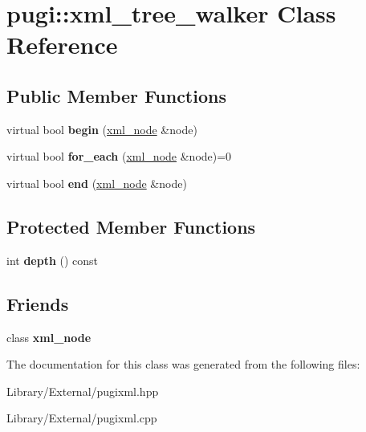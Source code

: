 \hypertarget{classpugi_1_1xml__tree__walker}{}\section{pugi\+:\+:xml\+\_\+tree\+\_\+walker Class Reference}
\label{classpugi_1_1xml__tree__walker}
\subsection*{Public Member Functions}
\begin{DoxyCompactItemize}
\item 
\hypertarget{classpugi_1_1xml__tree__walker_a831cc2fc61a47e23673c85efc41bc7a2}{}virtual bool {\bfseries begin} (\hyperlink{classpugi_1_1xml__node}{xml\+\_\+node} \&node)\label{classpugi_1_1xml__tree__walker_a831cc2fc61a47e23673c85efc41bc7a2}

\item 
\hypertarget{classpugi_1_1xml__tree__walker_a309363c9d17ef3fc8cacc6f71fcbea88}{}virtual bool {\bfseries for\+\_\+each} (\hyperlink{classpugi_1_1xml__node}{xml\+\_\+node} \&node)=0\label{classpugi_1_1xml__tree__walker_a309363c9d17ef3fc8cacc6f71fcbea88}

\item 
\hypertarget{classpugi_1_1xml__tree__walker_a24e6ffd4a8351e2ee486440b6f784091}{}virtual bool {\bfseries end} (\hyperlink{classpugi_1_1xml__node}{xml\+\_\+node} \&node)\label{classpugi_1_1xml__tree__walker_a24e6ffd4a8351e2ee486440b6f784091}

\end{DoxyCompactItemize}
\subsection*{Protected Member Functions}
\begin{DoxyCompactItemize}
\item 
\hypertarget{classpugi_1_1xml__tree__walker_acb27ca9fea177b0741f29274cb0c805a}{}int {\bfseries depth} () const \label{classpugi_1_1xml__tree__walker_acb27ca9fea177b0741f29274cb0c805a}

\end{DoxyCompactItemize}
\subsection*{Friends}
\begin{DoxyCompactItemize}
\item 
\hypertarget{classpugi_1_1xml__tree__walker_a156d917a92815c7b593bd5ef19f6d5fb}{}class {\bfseries xml\+\_\+node}\label{classpugi_1_1xml__tree__walker_a156d917a92815c7b593bd5ef19f6d5fb}

\end{DoxyCompactItemize}


The documentation for this class was generated from the following files\+:\begin{DoxyCompactItemize}
\item 
Library/\+External/pugixml.\+hpp\item 
Library/\+External/pugixml.\+cpp\end{DoxyCompactItemize}
